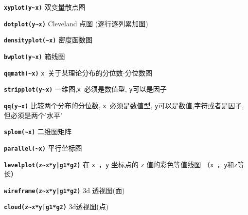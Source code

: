 \documentclass[landscape]{article}
\newcommand{\code}{\texttt}
\newcommand{\bcode}[1]{\texttt{\textbf{#1}}}
\begin{document}
\begin{multicols*}{3}
\bcode{xyplot(y\~{}x)}  双变量散点图


\bcode{dotplot(y\~{}x)}  Cleveland 点图 (逐行逐列累加图)

\bcode{densityplot(\~{}x)}  密度函数图


\bcode{bwplot(y\~{}x)}  箱线图

\bcode{qqmath(\~{}x)}   \code{x}~关于某理论分布的分位数-分位数图

\bcode{stripplot(y\~{}x)}  一维图,\code{x}~必须是数值型, \code{y}可以是因子

\bcode{qq(y\~{}x)}  比较两个分布的分位数, \code{x}~必须是数值型, \code{y}可以是数值,字符或者是因子,但必须是两个'水平'

\bcode{splom(\~{}x)}  二维图矩阵

\bcode{parallel(\~{}x)}  平行坐标图

\bcode{levelplot(z\~{}x*y|g1*g2)}  在 \code{x}~，\code{y} 坐标点的 \code{z} 值的彩色等值线图
（\code{x}~，\code{y}和\code{z}等长）

\bcode{wireframe(z\~{}x*y|g1*g2)}  3d 透视图(面)

\bcode{cloud(z\~{}x*y|g1*g2)}  3d透视图(点)


\end{multicols*}
\end{document}
